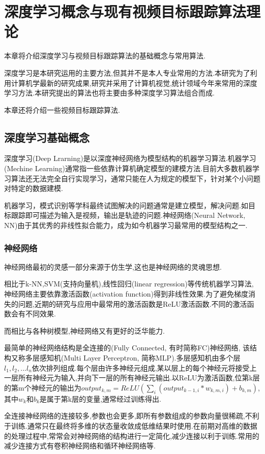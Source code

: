 
\chapter{深度学习概念与现有视频目标跟踪算法理论}
本章将介绍深度学习与视频目标跟踪算法的基础概念与常用算法.
\par
深度学习是本研究运用的主要方法,但其并不是本人专业常用的方法.本研究为了利用计算机学最新的研究成果,研究并采用了计算机视觉,统计领域今年来常用的深度学习方法.本研究提出的算法也将主要由多种深度学习算法组合而成.
\par
本章还将介绍一些视频目标跟踪算法.
\section{深度学习基础概念}
深度学习(Deep Lrarning)是以深度神经网络为模型结构的机器学习算法\supercite{deng2014deep}.机器学习(Mechine Learning)通常指一些依靠计算机确定模型的建模方法.目前大多数机器学习算法还无法完全自行实现学习，通常只能在人为规定的模型下，针对某个小问题对特定的数据建模.
\par
机器学习，模式识别等学科最终试图解决的问题通常是建立模型，解决问题.如目标跟踪即可描述为输入是视频，输出是轨迹的问题.神经网络(Neural Network, NN)由于其优秀的非线性拟合能力，成为如今机器学习最常用的模型结构之一.
\subsection{神经网络}
神经网络最初的灵感一部分来源于仿生学\supercite{mcculloch1943logical}\supercite{farley1954simulation},这也是神经网络的灵魂思想.
\par
相比于k-NN,SVM(支持向量机),线性回归(linear regression)等传统机器学习算法,神经网络主要依靠激活函数(activation function)得到非线性效果.为了避免梯度消失的问题,近期的研究与应用中最常用的激活函数是ReLU激活函数\supercite{krizhevsky2012imagenet}.不同的激活函数会有不同效果\supercite{karlik2011performance}.
\par
而相比与各种树模型,神经网络又有更好的泛华能力.
\par
最简单的神经网络结构是全连接的(Fully Connected, 有时简称FC)神经网络, 该结构又称多层感知机(Multi Layer Perceptron, 简称MLP).多层感知机由多个层$l_1,l_2,...l_n$依次排列组成.每个层由许多神经元组成,某以层上的每个神经元将接受上一层所有神经元为输入,并向下一层的所有神经元输出.以ReLU为激活函数,位第k层的第m个神经元的输出为$output_{k,m}=ReLU(\sum_{i} (output_{k-1,i}*w_{k,m,i})+b_{k,m})$,其中$w_{k}$和$b_{k}$是属于第k层的变量,通常经过训练得出.
\par
全连接神经网络的连接较多,参数也会更多,即所有参数组成的参数向量很稀疏,不利于训练.通常只在最终将多维的状态量收敛成低维结果时使用.在前期对高维的数据的处理过程中,常常会对神经网络的结构进行一定简化,减少连接以利于训练.常用的减少连接方式有卷积神经网络和循环神经网络等.
\par
